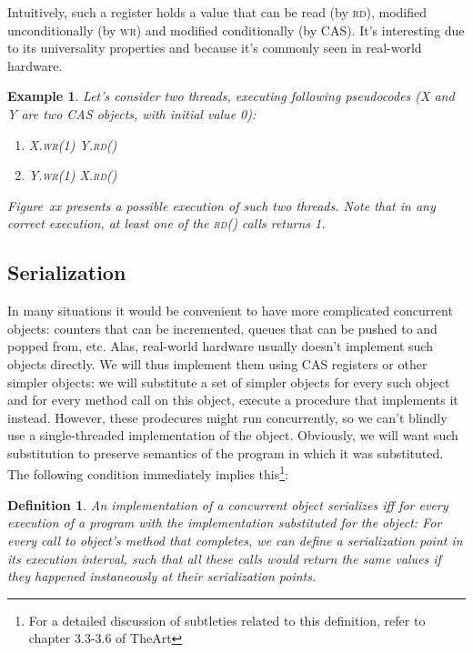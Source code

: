 \documentclass[a4paper,11pt]{article}
\newtheorem{example}{Example}
\newtheorem{definition}{Definition}
\newcommand{\fn}[1]{\textsc{#1}}
\begin{document}
Intuitively, such a register holds a value that can be read (by \fn{rd}), modified unconditionally (by \fn{wr})
and modified conditionally (by \fn{CAS}). It's interesting due to its universality properties %
and because it's
commonly seen in real-world hardware. %

\begin{example}
Let's consider two threads, executing following pseudocodes (X and Y are two CAS objects, with initial value 0):

\begin{enumerate}
\item\begin{algorithmic}[1]
\State X.\fn{wr}(1)
\State Y.\fn{rd}()
\end{algorithmic}

\item\begin{algorithmic}[1]
\State Y.\fn{wr}(1)
\State X.\fn{rd}()
\end{algorithmic}
\end{enumerate}

Figure~xx presents a possible execution of such two threads. Note that in any correct execution,
at least one of the \fn{rd}() calls returns 1.
\end{example}

\subsection{Serialization}
In many situations it would be convenient to have more complicated concurrent objects: counters that can be incremented,
queues that can be pushed to and popped from, etc. Alas, real-world hardware usually doesn't implement such objects
directly. We will thus implement them using CAS registers or other simpler objects: we will substitute a set of simpler objects for every such object and for every method call on this object, execute a procedure that implements it instead.
However, these prodecures might run concurrently, so we can't blindly use a single-threaded implementation of the object.
Obviously, we will want such substitution to preserve semantics of the program in which it was substituted. The following condition immediately implies
this\footnote{For a detailed discussion of subtleties related to this definition, refer to chapter 3.3-3.6 of TheArt}:

\begin{definition}
An implementation of a concurrent object \emph{serializes} iff for every execution of a program with the implementation
substituted for the object:
For every call to object's method that completes, we can define a \emph{serialization point} in its execution
interval, such that all these calls would return the same values if they happened instaneously at their serialization
points.
\end{definition}
\end{document}
